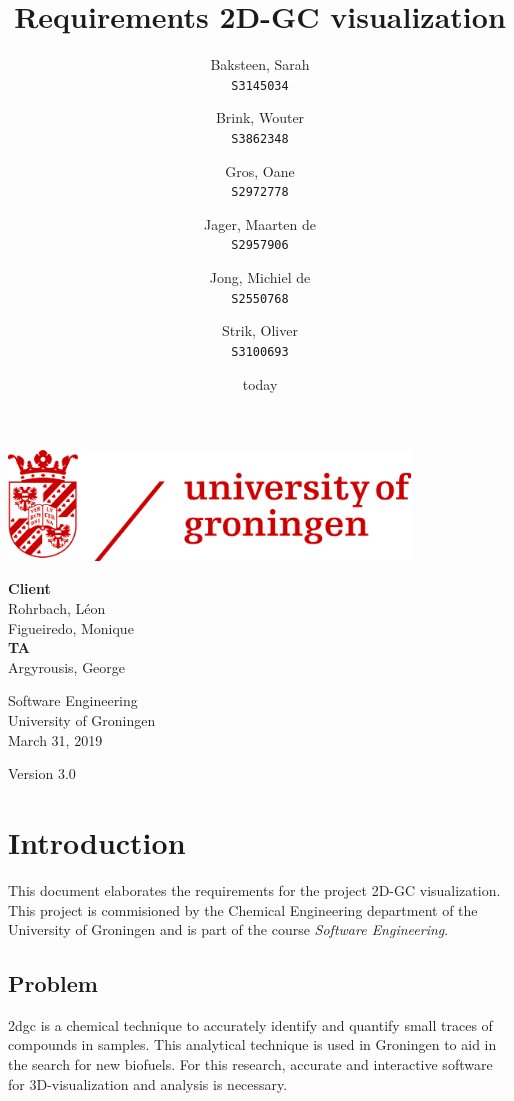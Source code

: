 \documentclass{article}
\title{Requirements 2D-GC visualization}
\author{
  Baksteen, Sarah\\
  \texttt{S3145034}
  \and
  Brink, Wouter\\
  \texttt{S3862348}
  \and
  Gros, Oane\\
  \texttt{S2972778}
  \and
  Jager, Maarten de \\
  \texttt{S2957906}
  \and
  Jong, Michiel de \\
  \texttt{S2550768}
  \and
  Strik, Oliver\\
  \texttt{S3100693}
}
\date{today}
\begin{document}
\clearpage
\maketitle
\thispagestyle{empty}
\begin{center}
    \vfill
    \includegraphics[width=0.8\textwidth]{UG_logo.jpg}
    \vfill
    
    \Large
    \textbf{Client} \\
    Rohrbach, Léon \\
    Figueiredo, Monique \\
    
    \vspace{1cm}
    \textbf{TA} \\
    Argyrousis, George
    
    \vspace{2cm}
        Software Engineering \\
        University of Groningen \\
        March 31, 2019  \\
        \empty
        
        \vspace{1cm}
        Version 3.0
\end{center}

\newpage\setcounter{page}{1}
\section{Introduction}
This document elaborates the requirements for the project 2D-GC visualization. This project is commisioned by the Chemical Engineering department of the University of Groningen and is part of the course \textit{Software Engineering}.  

\subsection*{Problem}
\acrfull{2dgc}  is a chemical technique to accurately identify and quantify small traces of compounds in samples. This analytical technique is used in Groningen to aid in the search for new biofuels. For this research, accurate and interactive software for 3D-visualization and analysis is necessary. 
\end{document}
